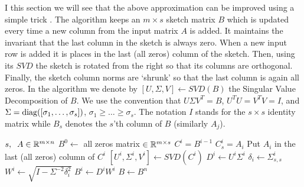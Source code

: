 I this section we will see that the above approximation can be improved using a simple trick \cite{LibertyMatrixSketching2012}.
The algorithm keeps an $m \times s$ sketch matrix $B$ which is updated
every time a new column from the input matrix $A$ is added. 
It maintains the invariant that the last column in the sketch is always zero.
When a new input row is added it is places in the last (all zeros) column of the sketch.
Then, using its $SVD$ the sketch is rotated from the right so that its columns are orthogonal.
Finally, the sketch column norms are `shrunk' so that the last column is again all zeros. 
In the algorithm we denote by $[U,\Sigma,V] \leftarrow SVD(B)$ the Singular Value Decomposition of $B$.
We use the convention that $U \Sigma V^T = B$, $U^{T}U = V^{T}V = I$, 
and $\Sigma = \operatorname{diag}([\sigma_1,\ldots,\sigma_s])$,  \;$\sigma_1 \ge \ldots \ge \sigma_s$.
The notation $I$ stands for the $s \times s$ identity matrix while $B_s$ denotes the $s$'th column of $B$ (similarly $A_j$).
\begin{algorithm} 
\label{alg}
\begin{algorithmic}
 $s, \;\;A \in {\mathbb{R}}^{m \times n}$ 
\STATE $B^{0} \leftarrow $ all zeros matrix $\in {\mathbb{R}}^{m \times s}$  
	\STATE $C^{i} = B^{i-1}$ \hfill %
	\STATE $C^{i}_{s} = A_i$ \hfill Put $A_i$ in the last (all zeros) column of $C^{i}$
	\STATE $[U^{i},\Sigma^{i},V^{i}] \leftarrow SVD(C^{i})$ %
	\STATE $D^{i} \leftarrow  U^{i}\Sigma^{i}$  %
	\STATE $\delta_i \leftarrow \Sigma^{i}_{s,s}$ %
	\STATE $W^{i} \leftarrow \sqrt{I - \Sigma^{-2}\delta^2_i}$
	\STATE $B^{i} \leftarrow D^{i}W^{i}$ %
\ENDFOR
{} $B \leftarrow B^{n}$ 
\end{algorithmic}
\end{algorithm}

